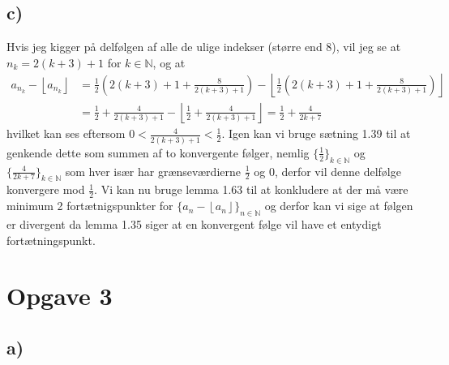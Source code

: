 \documentclass{article}
\newcommand{\m}[1]{\mathbb{#1}}
\newcommand{\mN}{\m{N}}
\newcommand{\floor}[1]{\left\lfloor #1\right\rfloor}
\begin{document}
\subsection*{c)}
Hvis jeg kigger på delfølgen af alle de ulige indekser (større end 8), vil jeg se at $n_k = 2(k+3)+1 $ for $k \in \mN$, og at
\begin{align*}
    a_{n_k} - \floor{a_{n_k}} &= \frac{1}{2} (2(k+3) + 1 + \frac{8}{2(k+3)+1}) - \floor{\frac{1}{2} (2(k+3) + 1 + \frac{8}{2(k+3)+1})}  \\
    &= \frac{1}{2} + \frac{4}{2(k+3)+1} - \floor{\frac{1}{2} + \frac{4}{2(k+3)+1}} = \frac{1}{2} + \frac{4}{2k+7} 
\end{align*}
hvilket kan ses eftersom $ 0 < \frac{4}{2(k+3)+1} < \frac{1}{2}$.
Igen kan vi bruge sætning 1.39 til at genkende dette som summen af to konvergente følger, nemlig $\{ \frac{1}{2} \}_{k \in \mN}$ og 
$\{ \frac{4}{2k+7} \}_{k \in \mN}$ som hver især har grænseværdierne $\frac{1}{2}$ og $0$, derfor vil denne delfølge konvergere mod $\frac{1}{2}$.
Vi kan nu bruge lemma 1.63 til at konkludere at der må være minimum 2 fortætnigspunkter for $\{ a_n - \floor{a_n} \}_{n \in \mN}$ og derfor kan vi sige at
følgen er divergent da lemma 1.35 siger at en konvergent følge vil have et entydigt fortætningspunkt.


\section*{Opgave 3}
\subsection*{a)}
\end{document}

